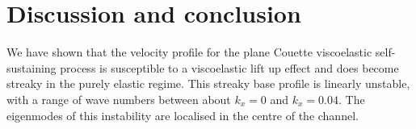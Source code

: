 \documentclass{jfm}
\begin{document}
\section{Discussion and conclusion}\label{sec:conclusion}

We have shown that the velocity profile for the plane Couette viscoelastic
self-sustaining process is susceptible to a viscoelastic lift up effect and
does become streaky in the purely elastic regime. This streaky base profile is
linearly unstable, with a range of wave numbers between about $k_x = 0$ and
$k_x = 0.04$. The eigenmodes of this instability are localised in the centre of
the channel.




\end{document}
